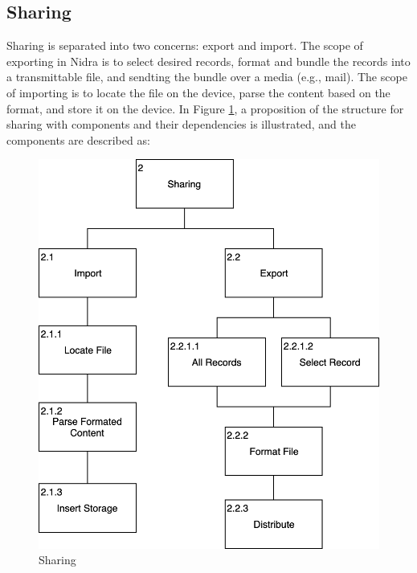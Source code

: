 \subsection{Sharing} \label{sec:design_sharing}

Sharing is separated into two concerns: export and import. The scope of exporting in Nidra is to select desired records, format and bundle the records into a transmittable file, and sendting the bundle over a media (e.g., mail). The scope of importing is to locate the file on the device, parse the content based on the format, and store it on the device. In Figure \ref{fig:hta_sharing}, a proposition of the structure for sharing with components and their dependencies is illustrated, and the components are described as:


\begin{figure}
    \centering
    \includegraphics[scale=0.3]{images/Sharing.png}
    \caption{Sharing}
    \label{fig:hta_sharing}
\end{figure}

